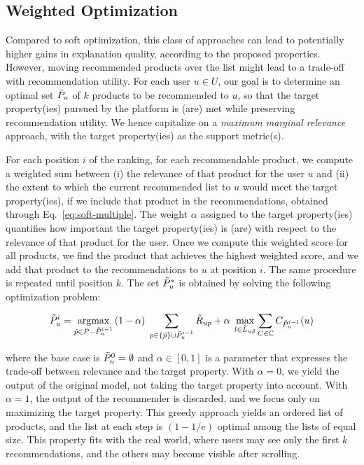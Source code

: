 \documentclass[sigconf]{acmart}
\begin{document}
\subsection{Weighted Optimization}
Compared to soft optimization, this class of approaches can lead to potentially higher gains in explanation quality, according to the proposed properties. 
However, moving recommended products over the list might lead to a trade-off with recommendation utility. 
For each user $u\in U$, our goal is to determine an optimal set $\Tilde{P}_u$ of $k$ products to be recommended to $u$, so that the target property(ies) pursued by the platform is (are) met while preserving recommendation utility. 
We hence capitalize on a \emph{maximum marginal relevance} approach, with the target property(ies) as the support metric(s). 

For each position $i$ of the ranking, for each recommendable product, we compute a weighted sum between (i) the relevance of that product for the user $u$ and (ii) {\color{black} the extent to which the current recommended list to $u$ would meet the target property(ies), if we include that product in the recommendations, obtained through Eq.~\eqref{eq:soft-multiple}.} 
The weight $\alpha$ assigned to the target property(ies) quantifies how important the target property(ies) is (are) with respect to the relevance of that product for the user. 
Once we compute this weighted score for all products, we find the product that achieves the highest weighted score, and we add that product to the recommendations to $u$ at position $i$. 
The same procedure is repeated until position $k$.
The set $\Tilde{P}_u^\ast$ is obtained by solving the following optimization problem: 

\begin{equation}\label{eq:opt_prob}
    \Tilde{P}_u^i = \mathop{\text{argmax}}_{\Tilde{p} \in P - \Tilde{P}_u^{i-1}}\, (1-\alpha) \; \sum_{p \in \{\Tilde{p}\} \cup \Tilde{P}_u^{i-1}} \Tilde{R}_{up} + \alpha \; \mathop{\text{max}}_{l \in \Tilde{L}_{u\Tilde{p}}} \sum_{C \in \mathbb C} C_{\Tilde{P}_u^{i-1}}(u)
\end{equation}

\noindent where the base case is $\Tilde{P}_u^0 = \emptyset$ and $\alpha \in [0,1]$ is a parameter that expresses the trade-off between relevance and the target property. 
With $\alpha=0$, we yield the output of the original model, not taking the target property into account.
With $\alpha=1$, the output of the recommender is discarded, and we focus only on maximizing the target property. 
This greedy approach yields an ordered list of products, and the list at each step is $(1 - 1/e)$ optimal among the lists of equal size. 
This property fits with the real world, where users may see only the first $k$ recommendations, and the others may become visible after scrolling. 
\end{document}
